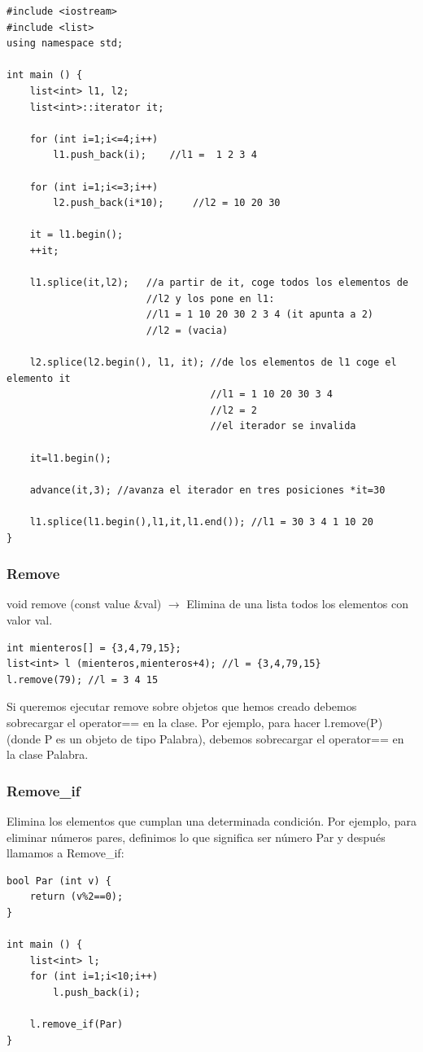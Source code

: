 \documentclass[10pt,a4paper,spanish]{report}
\begin{document}
\begin{verbatim}
#include <iostream>
#include <list>
using namespace std;

int main () {
    list<int> l1, l2;
    list<int>::iterator it;

    for (int i=1;i<=4;i++)
        l1.push_back(i);    //l1 =  1 2 3 4

    for (int i=1;i<=3;i++)
        l2.push_back(i*10);     //l2 = 10 20 30

    it = l1.begin();
    ++it;

    l1.splice(it,l2);   //a partir de it, coge todos los elementos de
                        //l2 y los pone en l1:
                        //l1 = 1 10 20 30 2 3 4 (it apunta a 2)
                        //l2 = (vacia)

    l2.splice(l2.begin(), l1, it); //de los elementos de l1 coge el elemento it
                                   //l1 = 1 10 20 30 3 4
                                   //l2 = 2
                                   //el iterador se invalida

    it=l1.begin();

    advance(it,3); //avanza el iterador en tres posiciones *it=30

    l1.splice(l1.begin(),l1,it,l1.end()); //l1 = 30 3 4 1 10 20
} 
\end{verbatim}

\subsubsection{\textcolor[rgb]{0.2,0.5,0.5}Remove}
\noindent
void remove (const value \&val) $\longrightarrow$ Elimina de una lista  todos los elementos con valor val.

\begin{verbatim}
int mienteros[] = {3,4,79,15};
list<int> l (mienteros,mienteros+4); //l = {3,4,79,15}
l.remove(79); //l = 3 4 15
\end{verbatim}

\noindent
Si queremos ejecutar remove sobre objetos que hemos creado debemos sobrecargar el operator== en la clase. Por ejemplo, para hacer l.remove(P) (donde P es un objeto de tipo Palabra), debemos sobrecargar el operator== en la clase Palabra.

\subsubsection{\textcolor[rgb]{0.2,0.5,0.5}Remove\_if}
\noindent
Elimina los elementos que cumplan una determinada condición. Por ejemplo, para eliminar números pares, definimos lo que significa ser número Par y después llamamos a Remove\_if:
\begin{verbatim}
bool Par (int v) {
    return (v%2==0);
}

int main () {
    list<int> l;
    for (int i=1;i<10;i++)
        l.push_back(i);

    l.remove_if(Par)
}
\end{verbatim}
\end{document}
